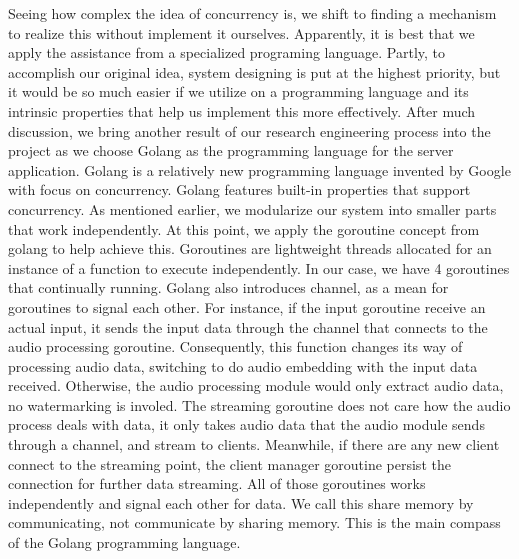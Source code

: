 \documentclass[conference]{IEEEtran}
\begin{document}
Seeing how complex the idea of concurrency is, we shift to finding a mechanism to realize this without implement it ourselves. Apparently, it is best that we apply the assistance from a specialized programing language. Partly, to accomplish our original idea, system designing is put at the highest priority, but it would be so much easier if we utilize on a programming language and its intrinsic properties that help us implement this more effectively. After much discussion, we bring another result of our research engineering process into the project as we choose Golang as the programming language for the server application. Golang is a relatively new programming language invented by Google with focus on concurrency. Golang features built-in properties that support concurrency. As mentioned earlier, we modularize our system into smaller parts that work independently. At this point, we apply the goroutine concept from golang to help achieve this. Goroutines are lightweight threads allocated for an instance of a function to execute independently. In our case, we have 4 goroutines that continually running. Golang also introduces channel, as a mean for goroutines to signal each other. For instance, if the input goroutine receive an actual input, it sends the input data through the channel that connects to the audio processing goroutine. Consequently, this function changes its way of processing audio data, switching to do audio embedding with the input data received. Otherwise, the audio processing module would only extract audio data, no watermarking is involed. The streaming goroutine does not care how the audio process deals with data, it only takes audio data that the audio module sends through a channel, and stream to clients. Meanwhile, if there are any new client connect to the streaming point, the client manager goroutine persist the connection for further data streaming. All of those goroutines works independently and signal each other for data. We call this share memory by communicating, not communicate by sharing memory. This is the main compass of the Golang programming language.
\end{document}
